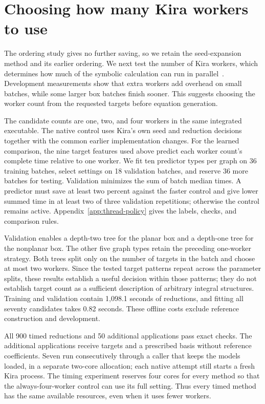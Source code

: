 \providecommand{\StudySection}{\section}
\providecommand{\StudySubsection}{\subsection}

\StudySection{Choosing how many Kira workers to use}
\label{sec:thread-policy}
The ordering study gives no further saving, so we retain the seed-expansion method and its earlier ordering. We next test the number of Kira workers, which determines how much of the symbolic calculation can run in parallel~\cite{KiraOriginal}. Development measurements show that extra workers add overhead on small batches, while some larger box batches finish sooner. This suggests choosing the worker count from the requested targets before equation generation.

The candidate counts are one, two, and four workers in the same integrated executable. The native control uses Kira's own seed and reduction decisions together with the common earlier implementation changes. For the learned comparison, the nine target features used above predict each worker count's complete time relative to one worker. We fit ten predictor types per graph on 36 training batches, select settings on 18 validation batches, and reserve 36 more batches for testing. Validation minimizes the sum of batch median times. A predictor must save at least two percent against the faster control and give lower summed time in at least two of three validation repetitions; otherwise the control remains active. Appendix~\ref{app:thread-policy} gives the labels, checks, and comparison rules.

Validation enables a depth-two tree for the planar box and a depth-one tree for the nonplanar box. The other five graph types retain the preceding one-worker strategy. Both trees split only on the number of targets in the batch and choose at most two workers. Since the tested target patterns repeat across the parameter splits, these results establish a useful decision within those patterns; they do not establish target count as a sufficient description of arbitrary integral structures. Training and validation contain 1,098.1 seconds of reductions, and fitting all seventy candidates takes 0.82 seconds. These offline costs exclude reference construction and development.

All 900 timed reductions and 50 additional applications pass exact checks. The additional applications receive targets and a prescribed basis without reference coefficients. Seven run consecutively through a caller that keeps the models loaded, in a separate two-core allocation; each native attempt still starts a fresh Kira process. The timing experiment reserves four cores for every method so that the always-four-worker control can use its full setting. Thus every timed method has the same available resources, even when it uses fewer workers.

